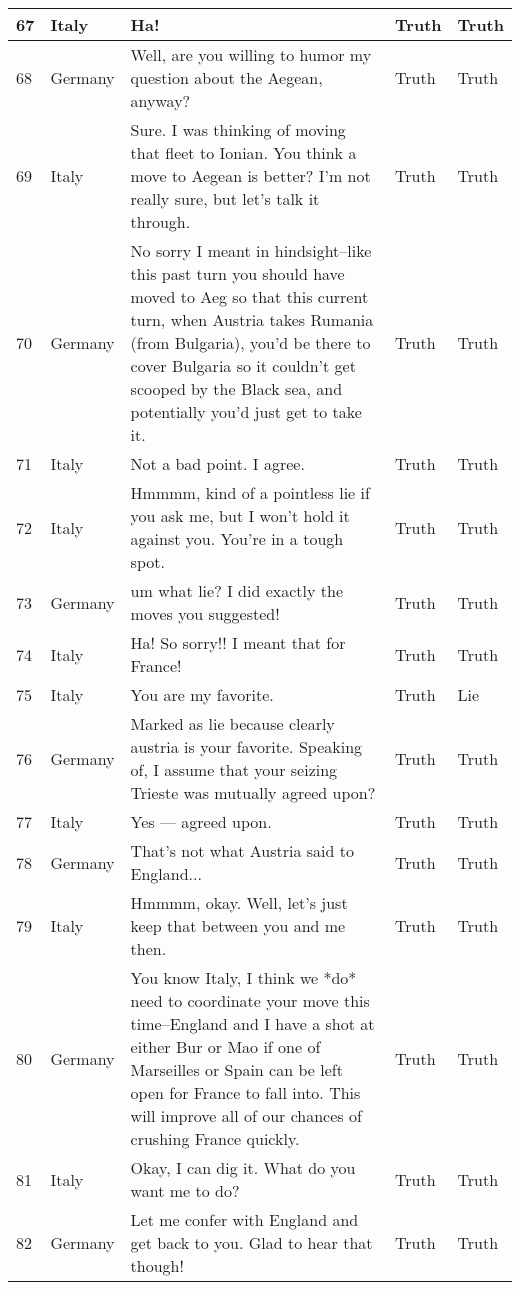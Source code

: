 \begin{longtable}{p{.3 cm} p{1.25cm} p{8.25cm} p{1.1cm} p{1.1cm}}
		\hline
		67 & Italy & Ha! & Truth & Truth \\
		\hline
		68 & Germany & Well, are you willing to humor my question about the Aegean, anyway? & Truth & Truth \\
		\hline
		69 & Italy & Sure. I was thinking of moving that fleet to Ionian. You think a move to Aegean is better? I'm not really sure, but let's talk it through. & Truth & Truth \\
		\hline
		70 & Germany & No sorry I meant in hindsight--like this past turn you should have moved to Aeg so that this current turn, when Austria takes Rumania (from Bulgaria), you'd be there to cover Bulgaria so it couldn't get scooped by the Black sea, and potentially you'd just get to take it. & Truth & Truth \\
		\hline
		71 & Italy & Not a bad point. I agree. & Truth & Truth \\
		\hline
		72 & Italy & Hmmmm, kind of a pointless lie if you ask me, but I won't hold it against you. You're in a tough spot. & Truth & Truth \\
		\hline
		73 & Germany & um what lie? I did exactly the moves you suggested! & Truth & Truth \\
		\hline
		74 & Italy & Ha! So sorry!! I meant that for France! & Truth & Truth \\
		\hline
		75 & Italy & You are my favorite. & Truth & Lie \\
		\hline
		76 & Germany & Marked as lie because clearly austria is your favorite.
		Speaking of, I assume that your seizing Trieste was mutually agreed upon? & Truth & Truth \\
		\hline
		77 & Italy & Yes --- agreed upon. & Truth & Truth \\
		\hline
		78 & Germany & That's not what Austria said to England... & Truth & Truth \\
		\hline
		79 & Italy & Hmmmm, okay. Well, let's just keep that between you and me then. & Truth & Truth \\
		\hline
		80 & Germany & You know Italy, I think we *do* need to coordinate your move this time--England and I have a shot at either Bur or Mao if one of Marseilles or Spain can be left open for France to fall into. This will improve all of our chances of crushing France quickly. & Truth & Truth \\
		\hline
		81 & Italy & Okay, I can dig it. What do you want me to do? & Truth & Truth \\
		\hline
		82 & Germany & Let me confer with England and get back to you. Glad to hear that though! & Truth & Truth \\

\end{longtable}
